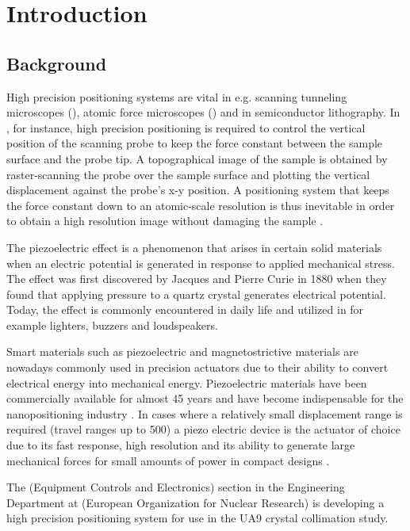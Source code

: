 \chapter{Introduction}\label{cha:intro}

\section{Background}
High precision positioning systems are vital in e.g. scanning tunneling microscopes (\abbrSTM), atomic force microscopes (\abbrAFM) and in semiconductor lithography. In \abbrAFM, for instance, high precision positioning is required to control the vertical position of the scanning probe to keep the force constant between the sample surface and the probe tip. A topographical image of the sample is obtained by raster-scanning the probe over the sample surface and plotting the vertical displacement against the probe's x-y position. A positioning system that keeps the force constant down to an atomic-scale resolution is thus inevitable in order to obtain a high resolution image without damaging the sample \citep{SurveyOfControlIssues:2007}.

The piezoelectric effect is a phenomenon that arises in certain solid materials when an electric potential is generated in response to applied mechanical stress. The effect was first discovered by Jacques and Pierre Curie in 1880 when they found that applying pressure to a quartz crystal generates electrical potential. Today, the effect is commonly encountered in daily life and utilized in for example lighters, buzzers and loudspeakers.

Smart materials such as piezoelectric and magnetostrictive materials are nowadays commonly used in precision actuators due to their ability to convert electrical energy into mechanical energy. Piezoelectric materials have been commercially available for almost 45 years and have become indispensable for the nanopositioning industry \citep{Piezo:2008}. In cases where a relatively small displacement range is required (travel ranges up to \unit{500}{\micro\meter}) a piezo electric device is the actuator of choice due to its fast response, high resolution and its ability to generate large mechanical forces for small amounts of power in compact designs \citep{SurveyOfControlIssues:2007}.

The \abbrECE (Equipment Controls and Electronics) section in the Engineering Department at \abbrCERN (European Organization for Nuclear Research) is developing a high precision positioning system for use in the UA9 crystal collimation study.

